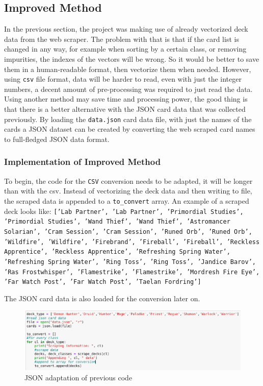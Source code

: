 \documentclass{report} %
\begin{document}
\subsection{Improved Method}
In the previous section, the project was making use of already vectorized deck data from the web scraper. The problem with that is that if the card list is changed in any way, for example when sorting by a certain class, or removing impurities, the indexes of the vectors will be wrong. So it would be better to save them in a human-readable format, then vectorize them when needed. However, using \nolinkurl{csv} file format, data will be harder to read, even with just the integer numbers, a decent amount of pre-processing was required to just read the data. Using another method may save time and processing power, the good thing is that there is a better alternative with the JSON card data that was collected previously. By loading the \nolinkurl{data.json} card data file, with just the names of the cards a JSON dataset can be created by converting the web scraped card names to full-fledged JSON data format.
\subsubsection{Implementation of Improved Method}

To begin, the code for the \nolinkurl{CSV} conversion needs to be adapted, it will be longer than with the csv. Instead of vectorizing the deck data and then writing to file, the scraped data is appended to a \nolinkurl{to_convert} array. An example of a scraped deck looks like:
\texttt{['Lab Partner', 'Lab Partner', 'Primordial Studies', 'Primordial Studies', 'Wand Thief', 'Wand Thief', 'Astromancer Solarian', 'Cram Session', 'Cram Session', 'Runed Orb', 'Runed Orb', 'Wildfire', 'Wildfire', 'Firebrand', 'Fireball', 'Fireball', 'Reckless Apprentice', 'Reckless Apprentice', 'Refreshing Spring Water', 'Refreshing Spring Water', 'Ring Toss', 'Ring Toss', 'Jandice Barov', 'Ras Frostwhisper', 'Flamestrike', 'Flamestrike', 'Mordresh Fire Eye', 'Far Watch Post', 'Far Watch Post', 'Taelan Fordring']}


The JSON card data is also loaded for the conversion later on.
\begin{figure}[H]
\centering
\includegraphics[width=1.25\textwidth]{improvedDC}
\caption{JSON adaptation of previous code\protect}
\label{board}
\end{figure}
\end{document}
